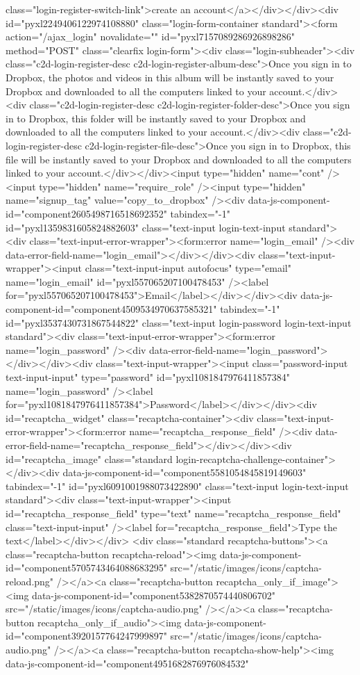 {class="login-register-switch-link">create an account</a></div></div><div id="pyxl2249406122974108880" class="login-form-container  standard"><form action="/ajax_login" novalidate="" id="pyxl7157089286926898286" method="POST" class="clearfix login-form"><div class="login-subheader"><div class="c2d-login-register-desc c2d-login-register-album-desc">Once you sign in to Dropbox, the photos and videos in this album will be instantly saved to your Dropbox and downloaded to all the computers linked to your account.</div><div class="c2d-login-register-desc c2d-login-register-folder-desc">Once you sign in to Dropbox, this folder will be instantly saved to your Dropbox and downloaded to all the computers linked to your account.</div><div class="c2d-login-register-desc c2d-login-register-file-desc">Once you sign in to Dropbox, this file will be instantly saved to your Dropbox and downloaded to all the computers linked to your account.</div></div><input type="hidden" name="cont" /><input type="hidden" name="require_role" /><input type="hidden" name="signup_tag" value="copy_to_dropbox" /><div data-js-component-id="component2605498716518692352" tabindex="-1" id="pyxl1359831605824882603" class="text-input login-text-input standard"><div class="text-input-error-wrapper"><form:error name="login_email" /><div data-error-field-name="login_email"></div></div><div class="text-input-wrapper"><input class="text-input-input autofocus" type="email" name="login_email" id="pyxl557065207100478453" /><label for="pyxl557065207100478453">Email</label></div></div><div data-js-component-id="component4509534970637585321" tabindex="-1" id="pyxl3537430731867544822" class="text-input login-password login-text-input standard"><div class="text-input-error-wrapper"><form:error name="login_password" /><div data-error-field-name="login_password"></div></div><div class="text-input-wrapper"><input class="password-input text-input-input" type="password" id="pyxl1081847976411857384" name="login_password" /><label for="pyxl1081847976411857384">Password</label></div></div><div id="recaptcha_widget" class="recaptcha-container"><div class="text-input-error-wrapper"><form:error name="recaptcha_response_field" /><div data-error-field-name="recaptcha_response_field"></div></div><div id="recaptcha_image" class="standard login-recaptcha-challenge-container"></div><div data-js-component-id="component5581054845819149603" tabindex="-1" id="pyxl6091001988073422890" class="text-input login-text-input standard"><div class="text-input-wrapper"><input id="recaptcha_response_field" type="text" name="recaptcha_response_field" class="text-input-input" /><label for="recaptcha_response_field">Type the text</label></div></div> <div class="standard recaptcha-buttons"><a class="recaptcha-button recaptcha-reload"><img data-js-component-id="component5705743464088683295" src="/static/images/icons/captcha-reload.png" /></a><a class="recaptcha-button recaptcha_only_if_image"><img data-js-component-id="component5382870574440806702" src="/static/images/icons/captcha-audio.png" /></a><a class="recaptcha-button recaptcha_only_if_audio"><img data-js-component-id="component3920157764247999897" src="/static/images/icons/captcha-audio.png" /></a><a class="recaptcha-button recaptcha-show-help"><img data-js-component-id="component4951682876976084532" }
